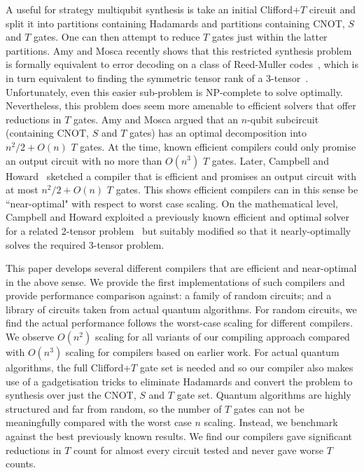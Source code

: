 \documentclass[notitlepage]{article}
\theoremstyle{definition}
\theoremstyle{problem}
\theoremstyle{lemma}
\begin{document}
		A useful for strategy multiqubit synthesis is take an initial Clifford+$T$ circuit and split it into partitions containing Hadamards and partitions containing CNOT, $S$ and $T$ gates.  One can then attempt to reduce $T$ gates just within the latter partitions.  Amy and Mosca recently shows that this restricted synthesis problem is formally equivalent to error decoding on a class of Reed-Muller codes~\cite{amy16}, which is in turn equivalent to finding the symmetric tensor rank of a 3-tensor~\cite{seroussi80}.  Unfortunately, even this easier sub-problem is  NP-complete to solve optimally.  Nevertheless, this problem does seem more amenable to efficient solvers that offer reductions in $T$ gates.  Amy and Mosca argued that an $n$-qubit subcircuit (containing CNOT, $S$ and $T$ gates) has an optimal decomposition into $n^2/2+O(n)$ $T$ gates.  At the time,  known efficient compilers could only promise an output circuit with no more than $O(n^3) $ $T$ gates.  Later, Campbell and Howard~\cite{campbell17b} sketched a compiler that is efficient and promises an output circuit with at most $n^2/2+O(n)$ $T$ gates.  This shows efficient compilers can in this sense be ``near-optimal" with respect to worst case scaling.   On the mathematical level, Campbell and Howard exploited a previously known efficient and optimal solver for a related 2-tensor problem~\cite{lempel75} but suitably modified so that it nearly-optimally solves the required 3-tensor problem.
		
		This paper develops several different compilers that are efficient and near-optimal in the above sense. We provide the first implementations of such compilers and provide performance comparison against: a family of random circuits; and a library of circuits taken from actual quantum algorithms.  For random circuits, we find the actual performance follows the worst-case scaling for different compilers.  We observe  $O(n^2)$ scaling for all variants of our compiling approach compared with $O(n^3)$ scaling for compilers based on earlier work.   For actual quantum algorithms, the full Clifford+$T$ gate set is needed and so our compiler also makes use of a gadgetisation tricks to eliminate Hadamards and convert the problem to synthesis over just the CNOT, $S$ and $T$ gate set.  Quantum algorithms are highly structured and far from random, so the number of $T$ gates can not be meaningfully compared with the worst case $n$ scaling.  Instead, we benchmark against the best previously known results.  We  find our compilers gave significant reductions in $T$ count for almost every circuit tested and never gave worse $T$ counts.
		
\end{document}
